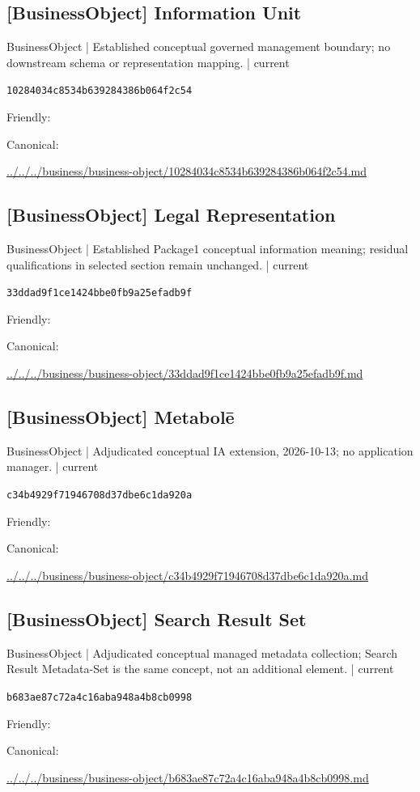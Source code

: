 \documentclass[10pt,a4paper]{article}
\begin{document}
\subsection*{[BusinessObject] Information Unit}
{\small BusinessObject | Established conceptual governed management boundary; no downstream schema or representation mapping. | current}\par
\texttt{10284034c8534b639284386b064f2c54}\par
Friendly: \par
Canonical: \par
{\footnotesize\url{../../../business/business-object/10284034c8534b639284386b064f2c54.md}}\par
\subsection*{[BusinessObject] Legal Representation}
{\small BusinessObject | Established Package1 conceptual information meaning; residual qualifications in selected section remain unchanged. | current}\par
\texttt{33ddad9f1ce1424bbe0fb9a25efadb9f}\par
Friendly: \par
Canonical: \par
{\footnotesize\url{../../../business/business-object/33ddad9f1ce1424bbe0fb9a25efadb9f.md}}\par
\subsection*{[BusinessObject] Metabolē}
{\small BusinessObject | Adjudicated conceptual IA extension, 2026-10-13; no application manager. | current}\par
\texttt{c34b4929f71946708d37dbe6c1da920a}\par
Friendly: \par
Canonical: \par
{\footnotesize\url{../../../business/business-object/c34b4929f71946708d37dbe6c1da920a.md}}\par
\subsection*{[BusinessObject] Search Result Set}
{\small BusinessObject | Adjudicated conceptual managed metadata collection; Search Result Metadata-Set is the same concept, not an additional element. | current}\par
\texttt{b683ae87c72a4c16aba948a4b8cb0998}\par
Friendly: \par
Canonical: \par
{\footnotesize\url{../../../business/business-object/b683ae87c72a4c16aba948a4b8cb0998.md}}\par
\end{document}
